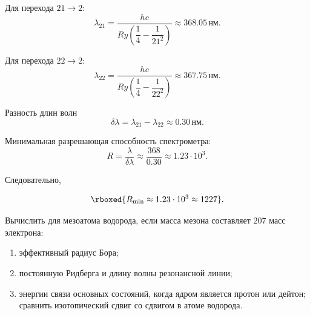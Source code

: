 \documentclass[../final.tex]{subfiles}
\begin{document}
Для перехода $21\rightarrow2$:
%
\begin{equation*}
    \lambda_{21}
    =
    \frac{hc}{
        Ry
        \left(
            \dfrac14
            -
            \dfrac{1}{21^2}
        \right)
    }
    \approx
    368.05\,\text{нм}.
\end{equation*}

Для перехода $22\rightarrow2$:
%
\begin{equation*}
    \lambda_{22}
    =
    \frac{hc}{
        Ry
        \left(
            \dfrac14
            -
            \dfrac{1}{22^2}
        \right)
    }
    \approx
    367.75\,\text{нм}.
\end{equation*}

Разность длин волн
%
\begin{equation*}
    \delta\lambda
    =
    \lambda_{21}
    -
    \lambda_{22}
    \approx
    0.30\,\text{нм}.
\end{equation*}

Минимальная разрешающая способность спектрометра:
%
\begin{equation*}
    R
    =
    \frac{\lambda}{\delta\lambda}
    \approx
    \frac{368}{0.30}
    \approx
    1.23\cdot10^3.
\end{equation*}

Следовательно,

\[
    \rboxed{
        R_{\min}
        \approx
        1.23\cdot10^3
        \approx
        1227
    }.
\]






\condition
Вычислить для мезоатома водорода, если масса мезона составляет
$207$ масс электрона:

\begin{enumerate}
    \item[а)]
    эффективный радиус Бора;

    \item[б)]
    постоянную Ридберга и длину волны резонансной линии;

    \item[в)]
    энергии связи основных состояний, когда ядром является
    протон или дейтон; сравнить изотопический сдвиг
    со сдвигом в атоме водорода.
\end{enumerate}
\end{document}
